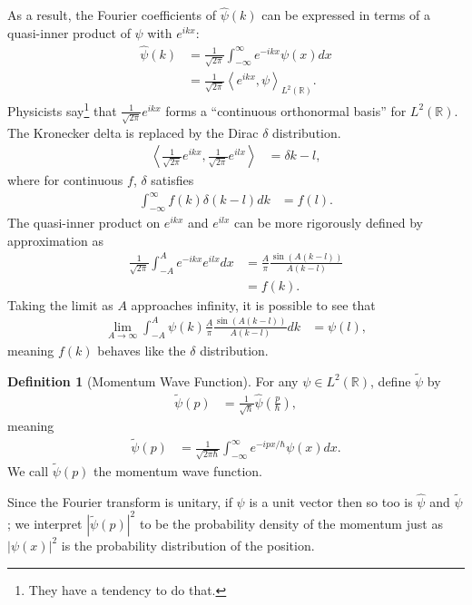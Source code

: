 \documentclass[12pt]{extarticle}
\newcommand{\R}{\mathbb{R}}
\newcommand{\iprod}[2]{\left\langle #1,#2\right\rangle}
\theoremstyle{plain}
\theoremstyle{definition}
\newtheorem*{definition}{Definition}
\theoremstyle{remark}
\renewcommand{\newline}{\hfill\break}
\begin{document}
  As a result, the Fourier coefficients of $\hat{\psi}(k)$ can be expressed in terms of a quasi-inner product of $\psi$ with $e^{ikx}$:
  \begin{align*}
    \hat{\psi}(k) &= \frac{1}{\sqrt{2\pi}}\int_{-\infty}^{\infty} e^{-ikx}\psi(x) dx\\
                  &= \frac{1}{\sqrt{2\pi}}\iprod{e^{ikx}}{\psi}_{L^{2}(\R)}.
  \end{align*}
  Physicists say\footnote{They have a tendency to do that.} that $\frac{1}{\sqrt{2\pi}}e^{ikx}$ forms a ``continuous orthonormal basis'' for $L^{2}(\R)$. The Kronecker delta is replaced by the Dirac $\delta$ distribution.
  \begin{align*}
    \iprod{\frac{1}{\sqrt{2\pi}}e^{ikx}}{\frac{1}{\sqrt{2\pi}}e^{ilx}} &= \delta{k-l},
  \end{align*}
  where for continuous $f$, $\delta$ satisfies
  \begin{align*}
    \int_{-\infty}^{\infty} f(k)\delta(k-l) dk &= f(l).
  \end{align*}
  The quasi-inner product on $e^{ikx}$ and $e^{ilx}$ can be more rigorously defined by approximation as
  \begin{align*}
    \frac{1}{\sqrt{2\pi}}\int_{-A}^{A} e^{-ikx}e^{ilx} dx &= \frac{A}{\pi}\frac{\sin\left(A(k-l)\right)}{A(k-l)}\\
                                                          &= f(k).
  \end{align*}
  Taking the limit as $A$ approaches infinity, it is possible to see that
  \begin{align*}
    \lim_{A\rightarrow\infty}\int_{-A}^{A} \psi(k)\frac{A}{\pi}\frac{\sin\left(A(k-l)\right)}{A(k-l)} dk &= \psi(l),
  \end{align*}
  meaning $f(k)$ behaves like the $\delta$ distribution.
  \begin{definition}[Momentum Wave Function]
    For any $\psi \in L^{2}(\R)$, define $\tilde{\psi}$ by
    \begin{align*}
      \tilde{\psi}(p) &= \frac{1}{\sqrt{\hbar}}\hat{\psi}\left(\frac{p}{\hbar}\right),
    \end{align*}
    meaning
    \begin{align*}
      \tilde{\psi}(p) &= \frac{1}{\sqrt{2\pi \hbar}}\int_{-\infty}^{\infty} e^{-ipx/\hbar}\psi(x) dx.
    \end{align*}
    We call $\tilde{\psi}(p)$ the momentum wave function.
  \end{definition}
  Since the Fourier transform is unitary, if $\psi$ is a unit vector then so too is $\hat{\psi}$ and $\tilde{\psi}$; we interpret $|\tilde{\psi}(p)|^2$ to be the probability density of the momentum just as $\left\vert \psi(x) \right\vert^2$ is the probability distribution of the position.\newline
\end{document}
